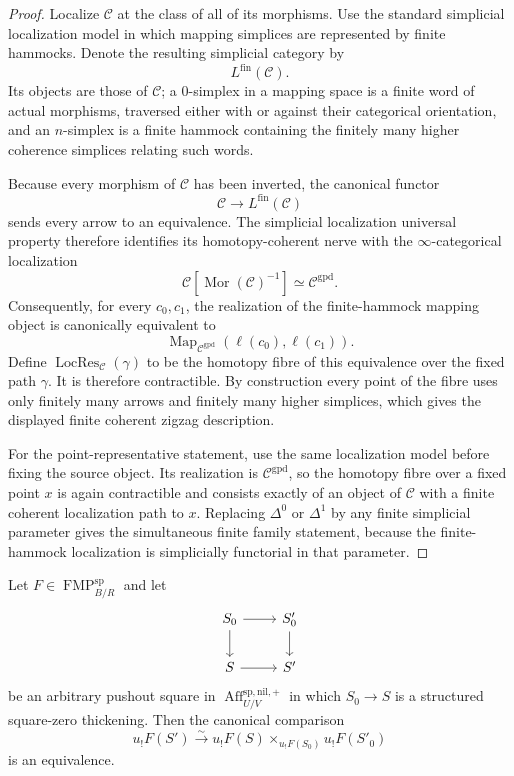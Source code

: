 \begin{proof}
Localize $\mathcal C$ at the class of all of its morphisms.  Use the standard
simplicial localization model in which mapping simplices are represented by
finite hammocks.  Denote the resulting simplicial category by
\[
    L^{\mathrm{fin}}(\mathcal C).
\]
Its objects are those of $\mathcal C$; a $0$-simplex in a mapping space is a
finite word of actual morphisms, traversed either with or against their
categorical orientation, and an $n$-simplex is a finite hammock containing the
finitely many higher coherence simplices relating such words.

Because every morphism of $\mathcal C$ has been inverted, the canonical
functor
\[
    \mathcal C\longrightarrow L^{\mathrm{fin}}(\mathcal C)
\]
sends every arrow to an equivalence.  The simplicial localization universal
property therefore identifies its homotopy-coherent nerve with the
$\infty$-categorical localization
\[
    \mathcal C[\operatorname{Mor}(\mathcal C)^{-1}]
    \simeq
    \mathcal C^{\mathrm{gpd}}.
\]
Consequently, for every $c_0,c_1$, the realization of the finite-hammock
mapping object is canonically equivalent to
\[
    \operatorname{Map}_{\mathcal C^{\mathrm{gpd}}}
    (\ell(c_0),\ell(c_1)).
\]
Define $\operatorname{LocRes}_{\mathcal C}(\gamma)$ to be the homotopy fibre
of this equivalence over the fixed path $\gamma$.  It is therefore
contractible.  By construction every point of the fibre uses only finitely
many arrows and finitely many higher simplices, which gives the displayed
finite coherent zigzag description.

For the point-representative statement, use the same localization model before
fixing the source object.  Its realization is
$\mathcal C^{\mathrm{gpd}}$, so the homotopy fibre over a fixed point $x$ is
again contractible and consists exactly of an object of $\mathcal C$ with a
finite coherent localization path to $x$.  Replacing $\Delta^0$ or
$\Delta^1$ by any finite simplicial parameter gives the simultaneous finite
family statement, because the finite-hammock localization is simplicially
functorial in that parameter.
\end{proof}

\begin{theorem}
\label{thm:bnli-unrestricted-square-zero-kan}
Let $F\in\operatorname{FMP}^{\mathrm{sp}}_{B/R}$ and let
\[
\begin{tikzcd}
S_0 \arrow[r] \arrow[d] & S'_0 \arrow[d]\\
S \arrow[r] & S'
\end{tikzcd}
\]
be an arbitrary pushout square in
$\operatorname{Aff}^{\mathrm{sp,nil,+}}_{U/V}$ in which $S_0\to S$ is a
structured square-zero thickening.  Then the canonical comparison
\[
\boxed{
    u_!F(S')
    \xrightarrow{\sim}
    u_!F(S)\times_{u_!F(S_0)}u_!F(S'_0)}
\]
is an equivalence.
\end{theorem}

